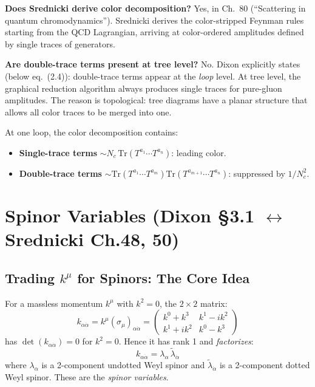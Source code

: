 \textbf{Does Srednicki derive color decomposition?} Yes, in Ch.~80 (``Scattering in quantum chromodynamics''). Srednicki derives the color-stripped Feynman rules starting from the QCD Lagrangian, arriving at color-ordered amplitudes defined by single traces of generators.

\textbf{Are double-trace terms present at tree level?} No. Dixon explicitly states (below eq.~(2.4)): double-trace terms appear at the \emph{loop} level. At tree level, the graphical reduction algorithm always produces single traces for pure-gluon amplitudes. The reason is topological: tree diagrams have a planar structure that allows all color traces to be merged into one.

At one loop, the color decomposition contains:
\begin{itemize}
  \item \textbf{Single-trace terms} $\sim N_c\,\mathrm{Tr}(T^{a_1}\cdots T^{a_n})$: leading color.
  \item \textbf{Double-trace terms} $\sim\mathrm{Tr}(T^{a_1}\cdots T^{a_m})\mathrm{Tr}(T^{a_{m+1}}\cdots T^{a_n})$: suppressed by $1/N_c^2$.
\end{itemize}


\section{Spinor Variables (Dixon \S3.1 $\leftrightarrow$ Srednicki Ch.48, 50)}
\label{sec:spinor-variables}

\subsection{Trading $k^\mu$ for Spinors: The Core Idea}

For a massless momentum $k^\mu$ with $k^2=0$, the $2\times2$ matrix:
\begin{equation}
  k_{\alpha\dot\alpha} = k^\mu(\sigma_\mu)_{\alpha\dot\alpha}
  = \begin{pmatrix}k^0+k^3 & k^1-ik^2\\ k^1+ik^2 & k^0-k^3\end{pmatrix}
\end{equation}
has $\det(k_{\alpha\dot\alpha})=0$ for $k^2=0$. Hence it has rank 1 and \emph{factorizes}:
\begin{equation}
  \boxed{k_{\alpha\dot\alpha} = \lambda_\alpha\,\tilde\lambda_{\dot\alpha}}
  \tag{Sred 50.1 / Dixon 3.2}
\end{equation}
where $\lambda_\alpha$ is a 2-component undotted Weyl spinor and $\tilde\lambda_{\dot\alpha}$
is a 2-component dotted Weyl spinor. These are the \emph{spinor variables}.

